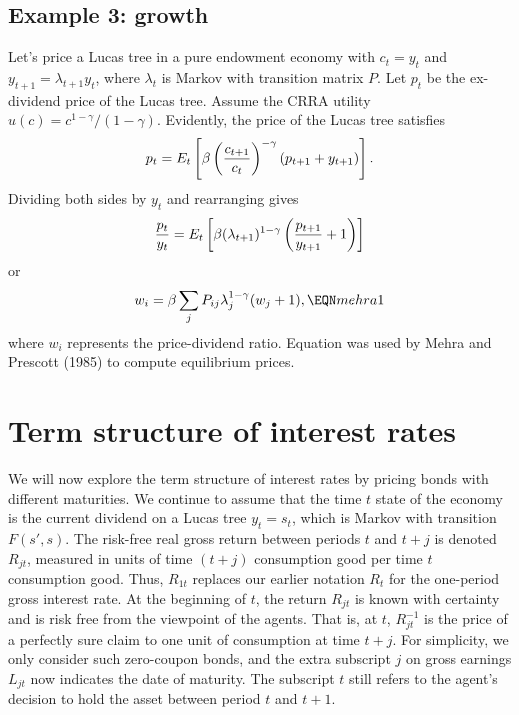 \subsection{Example 3: growth}

Let's price a Lucas tree in a pure endowment economy
with $c_t = y_t$ and  $y_{t+1} = \lambda_{t+1} y_t$, where
$\lambda_t$ is Markov with transition
matrix $P$.    Let $p_t$ be the ex-dividend price of
the Lucas tree.   Assume the CRRA utility
$u(c) = c^{1-\gamma} / (1-\gamma)$.
Evidently, the price of the Lucas tree satisfies
$$ p_t = E_t\left[\beta \left({c_{t+1} \over c_t}\right)^{-\gamma}
      \left( p_{t+1} + y_{t+1}  \right) \right] .$$
Dividing both sides by $y_t$ and rearranging gives
$$ {p_t \over y_t} = E_t \left[ \beta (\lambda_{t+1})^{1 - \gamma}
    \left( { p_{t+1} \over y_{t+1} } + 1\right) \right] $$
or
$$ w_i = \beta \sum_j  P_{ij} \lambda_j^{1 -\gamma} (w_j+1) ,
    \EQN mehra1 $$
where $w_i$ represents the price-dividend ratio. Equation  was
used by Mehra and Prescott (1985) to compute equilibrium prices.

\section{Term structure of interest rates}

We will now explore the term structure of interest rates by pricing
bonds with different maturities.  We continue to assume that
the time $t$ state of the economy is the current dividend
on a Lucas tree $y_t = s_t$, which is Markov with
transition $F(s',s)$.  The risk-free real gross return between
periods $t$ and $t+j$ is denoted $R_{jt}$, measured in units
of time $(t+j)$ consumption good per time $t$ consumption good.
Thus, $R_{1t}$ replaces our earlier notation $R_{t}$ for the
one-period gross interest rate.  At the beginning of $t$, the return
$R_{jt}$ is known with certainty and is risk free from the viewpoint
of the agents.  That is, at $t$, $R_{jt}^{-1}$ is the price of a perfectly
sure claim to one unit of consumption at time $t+j$.  For simplicity, we
only consider such zero-coupon bonds, and the extra subscript $j$ on gross
earnings $L_{jt}$ now indicates the date of maturity.  The subscript $t$ still
refers to the agent's decision to hold the asset between period $t$ and $t+1$.

